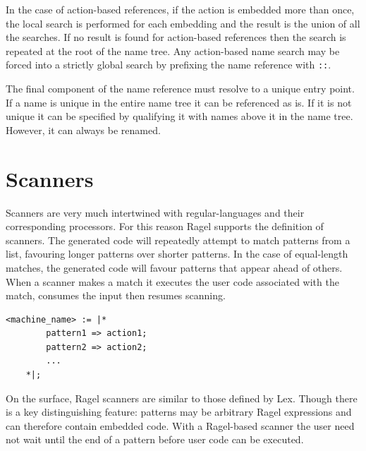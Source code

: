 \documentclass[letterpaper,11pt,oneside]{book}
\newcommand{\verbspace}{\vspace{10pt}}
\begin{document}
In the case of action-based references, if the action is embedded more than
once, the local search is performed for each embedding and the result is the
union of all the searches. If no result is found for action-based references then
the search is repeated at the root of the name tree.  Any action-based name
search may be forced into a strictly global search by prefixing the name
reference with \verb|::|.

The final component of the name reference must resolve to a unique entry point.
If a name is unique in the entire name tree it can be referenced as is. If it
is not unique it can be specified by qualifying it with names above it in the
name tree. However, it can always be renamed.



\section{Scanners}
\label{generating-scanners}

Scanners are very much intertwined with regular-languages and their
corresponding processors. For this reason Ragel supports the definition of
scanners.  The generated code will repeatedly attempt to match patterns from a
list, favouring longer patterns over shorter patterns.  In the case of
equal-length matches, the generated code will favour patterns that appear ahead
of others. When a scanner makes a match it executes the user code associated
with the match, consumes the input then resumes scanning.

\verbspace
\begin{verbatim}
<machine_name> := |* 
        pattern1 => action1;
        pattern2 => action2;
        ...
    *|;
\end{verbatim}
\verbspace

On the surface, Ragel scanners are similar to those defined by Lex. Though
there is a key distinguishing feature: patterns may be arbitrary Ragel
expressions and can therefore contain embedded code. With a Ragel-based scanner
the user need not wait until the end of a pattern before user code can be
executed.
\end{document}
